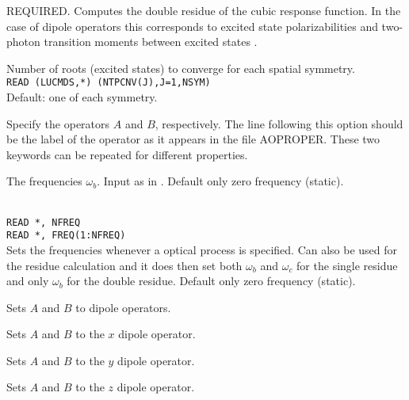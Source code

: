 \begin{description}

\item{}
REQUIRED.
Computes the double residue of the cubic
response function.
In the case of dipole operators this corresponds to excited
state polarizabilities and two-photon transition
moments 
between excited states \cite{djpnylhajcp105}.

\item{}
Number of roots (excited states) to converge for each spatial symmetry. \\
\verb|READ (LUCMDS,*) (NTPCNV(J),J=1,NSYM)|\\
Default: one of each symmetry.

\item[\Key{APROP}, \Key{BPROP}]
Specify the operators $A$ and $B$, respectively. The line following this
option should be the label of the operator as it appears in the file
AOPROPER. These two keywords can be repeated for different properties.

\item[\Key{BFREQ}]
The frequencies
$\omega_b$. Input as in .
Default only zero frequency (static).

\item{}\\
\verb|READ *, NFREQ|\\
\verb|READ *, FREQ(1:NFREQ)|\\
Sets the frequencies whenever a optical process is specified.
Can also be used for the residue calculation and it does then set 
both $\omega_b$ and $\omega_c$ for the single residue and only
$\omega_b$ for the double residue.
Default only zero frequency (static).

\item{}
Sets $A$ and  $B$ to dipole operators.

\item{}
Sets $A$ and $B$ to the $x$ dipole operator.

\item{}
Sets $A$ and $B$ to the $y$ dipole operator.

\item{}
Sets $A$ and $B$ to the $z$ dipole operator.


\end{description}
